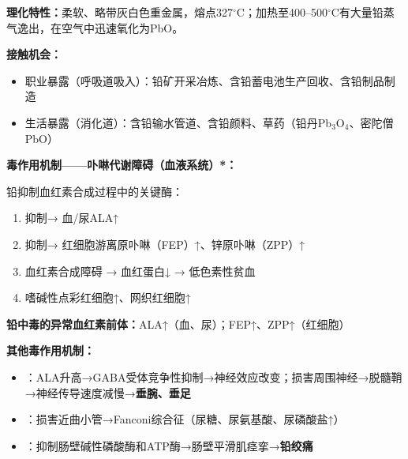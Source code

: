 \begin{keybox}
\textbf{理化特性：}柔软、略带灰白色重金属，熔点327$^\circ$C；加热至400--500$^\circ$C有大量铅蒸气逸出，在空气中迅速氧化为PbO。

\textbf{接触机会：}
\begin{itemize}[leftmargin=*]
    \item 职业暴露（呼吸道吸入）：铅矿开采冶炼、含铅蓄电池生产回收、含铅制品制造
    \item 生活暴露（消化道）：含铅输水管道、含铅颜料、草药（铅丹Pb$_3$O$_4$、密陀僧PbO）
\end{itemize}

\textbf{毒作用机制——卟啉代谢障碍（血液系统）*：}

铅抑制血红素合成过程中的关键酶：
\begin{enumerate}[leftmargin=*]
    \item 抑制→ 血/尿ALA↑
    \item 抑制→ 红细胞游离原卟啉（FEP）↑、锌原卟啉（ZPP）↑
    \item 血红素合成障碍 → 血红蛋白↓ → 低色素性贫血
    \item 嗜碱性点彩红细胞↑、网织红细胞↑
\end{enumerate}

\textbf{铅中毒的异常血红素前体：}ALA↑（血、尿）；FEP↑、ZPP↑（红细胞）

\textbf{其他毒作用机制：}
\begin{itemize}[leftmargin=*]
    \item {}：ALA升高→GABA受体竞争性抑制→神经效应改变；损害周围神经→脱髓鞘→神经传导速度减慢→\textbf{垂腕、垂足}
    \item {}：损害近曲小管→Fanconi综合征（尿糖、尿氨基酸、尿磷酸盐↑）
    \item {}：抑制肠壁碱性磷酸酶和ATP酶→肠壁平滑肌痉挛→\textbf{铅绞痛}
\end{itemize}
\end{keybox}

